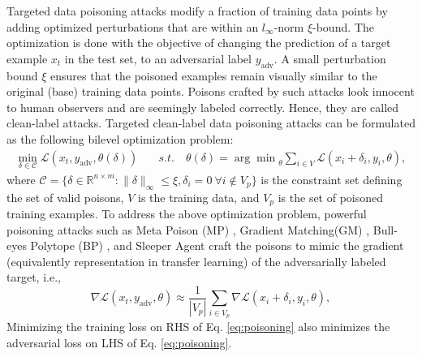 \documentclass{article}
\begin{document}
Targeted data poisoning attacks modify a fraction of training data points %
by adding optimized perturbations
that are within an $l_\infty$-norm $\xi$-bound. The optimization is done with the objective of changing the prediction of a target example $x_t$ in the test set, to an adversarial label $y_{\text{adv}}$.
A small perturbation bound $\xi$ ensures that the poisoned examples
remain visually similar to the original (base) training data points. Poisons crafted by such attacks look innocent to human observers and are seemingly labeled correctly. Hence, they are called clean-label attacks.
Targeted clean-label data poisoning attacks can be formulated as the following bilevel optimization problem:
\begin{align}\label{eq:poisoning}
    \min_{\delta \in\mathcal{C}} \mathcal{L}(x_t, y_{\text{adv}}, \theta(\delta)) &\quad s.t.\quad \theta(\delta)\! =\! {\arg\min}_\theta \sum_{i\in V} \mathcal{L}(x_i\!+\!\delta_i, y_i, \theta),
\end{align}
where $\mathcal{C}\!\!=\!\{\delta\!\in\mathbb{R}^{n\times m}\!\!: \!\|\delta\|_\infty\!\!\leq\xi, \delta_i\!=\!0 ~\forall i\notin V_p\}$ is the constraint set defining the set of valid poisons, $V$ is the training data, and $V_p$ is the set of poisoned training examples. 
To address the above optimization problem, powerful poisoning attacks such as Meta Poison (MP) \citep{huang2020metapoison}, Gradient Matching(GM) \cite{geiping2020witches}, Bull-eyes Polytope (BP) \cite{aghakhani2021bullseye}, and Sleeper Agent \citep{souri2021sleeper} craft the poisons to mimic the gradient (equivalently representation in transfer learning) of the adversarially labeled target, i.e.,
\begin{equation}\label{eq:matching}
    \nabla\mathcal{L}(x_t,y_{\text{adv}},\theta)\approx\frac{1}{|V_p|}\sum_{i\in V_p} \nabla\mathcal{L}(x_i+\delta_i,y_i,\theta),
\end{equation} 
Minimizing the training loss on RHS of Eq. \!\!\eqref{eq:poisoning}
also minimizes the adversarial loss on LHS of Eq. \!\! \eqref{eq:poisoning}. 
\end{document}
